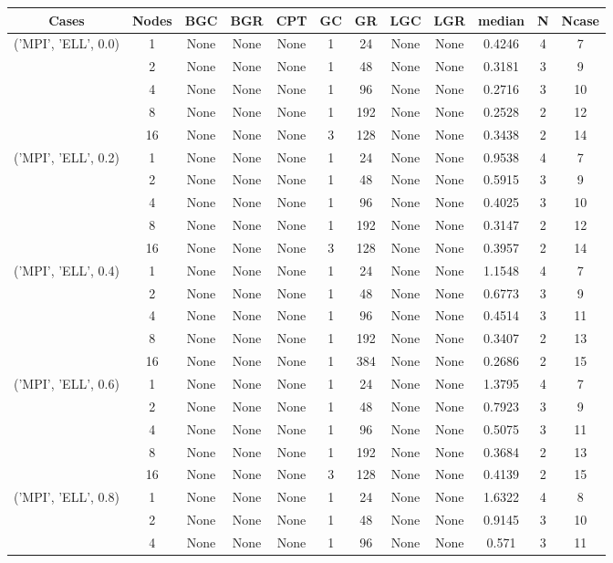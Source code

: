 \begin{tabular}{cccccccccccc}
\hline
Cases & Nodes& BGC& BGR& CPT& GC& GR& LGC& LGR& median & N & Ncase \\
\hline
\multirow{5}{*}{('MPI', 'ELL', 0.0)}& 1& None& None& None& 1& 24& None& None& 0.4246& 4& 7\\
& 2& None& None& None& 1& 48& None& None& 0.3181& 3& 9\\
& 4& None& None& None& 1& 96& None& None& 0.2716& 3& 10\\
& 8& None& None& None& 1& 192& None& None& 0.2528& 2& 12\\
& 16& None& None& None& 3& 128& None& None& 0.3438& 2& 14\\
\hline
\multirow{5}{*}{('MPI', 'ELL', 0.2)}& 1& None& None& None& 1& 24& None& None& 0.9538& 4& 7\\
& 2& None& None& None& 1& 48& None& None& 0.5915& 3& 9\\
& 4& None& None& None& 1& 96& None& None& 0.4025& 3& 10\\
& 8& None& None& None& 1& 192& None& None& 0.3147& 2& 12\\
& 16& None& None& None& 3& 128& None& None& 0.3957& 2& 14\\
\hline
\multirow{5}{*}{('MPI', 'ELL', 0.4)}& 1& None& None& None& 1& 24& None& None& 1.1548& 4& 7\\
& 2& None& None& None& 1& 48& None& None& 0.6773& 3& 9\\
& 4& None& None& None& 1& 96& None& None& 0.4514& 3& 11\\
& 8& None& None& None& 1& 192& None& None& 0.3407& 2& 13\\
& 16& None& None& None& 1& 384& None& None& 0.2686& 2& 15\\
\hline
\multirow{5}{*}{('MPI', 'ELL', 0.6)}& 1& None& None& None& 1& 24& None& None& 1.3795& 4& 7\\
& 2& None& None& None& 1& 48& None& None& 0.7923& 3& 9\\
& 4& None& None& None& 1& 96& None& None& 0.5075& 3& 11\\
& 8& None& None& None& 1& 192& None& None& 0.3684& 2& 13\\
& 16& None& None& None& 3& 128& None& None& 0.4139& 2& 15\\
\hline
\multirow{5}{*}{('MPI', 'ELL', 0.8)}& 1& None& None& None& 1& 24& None& None& 1.6322& 4& 8\\
& 2& None& None& None& 1& 48& None& None& 0.9145& 3& 10\\
& 4& None& None& None& 1& 96& None& None& 0.571& 3& 11\\

\end{tabular}
